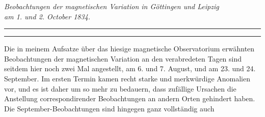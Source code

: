 \par\vspace{.044\textheight}
\begin{center}
{\itshape Beobachtungen der magnetischen Variation in Göttingen und Leipzig\\
am \textup{1.} und \textup{2.} October \textup{1834.}\par}
\medskip
\rule{.777\linewidth}{.35pt}\par
{}\par
\rule{.777\linewidth}{.35pt}
\end{center}
Die in meinem Aufsatze über das hiesige magnetische Observatorium erwähnten Beobachtungen der magnetischen Variation an den verabredeten Tagen sind seitdem hier noch zwei Mal angestellt, am 6. und 7. August, und am 23. und 24. September. Im ersten Termin kamen recht starke und merkwürdige Anomalien vor, und es ist daher um so mehr zu bedauern, dass zufällige Ursachen die Anstellung correspondirender Beobachtungen an andern Orten gehindert haben. Die September-Beobachtungen sind hingegen ganz vollständig auch
